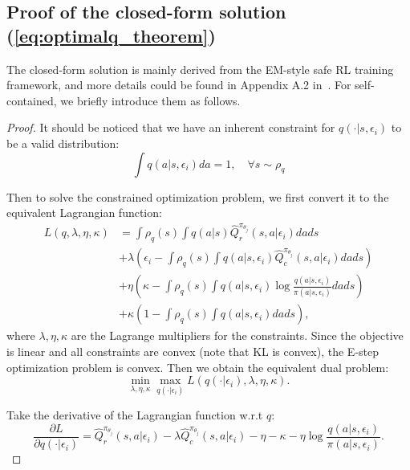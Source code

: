 \subsection{Proof of the closed-form solution (\ref{eq:optimalq_theorem})}
The closed-form solution is mainly derived from the EM-style safe RL training framework, and more details could be found in Appendix A.2 in~\cite{liu2022constrained}. For self-contained, we briefly introduce them as follows.
\label{app_subsection: Proof of the closed-form solution}
\begin{proof}
It should be noticed that we have an inherent constraint for $q(\cdot |s, \epsilon_i )$ to be a valid distribution:
\begin{equation}
    \int q(a | s, \epsilon_i) da = 1, \quad \forall s \sim \rho_q
\end{equation}

Then to solve the constrained optimization problem, we first convert it to the equivalent Lagrangian function:
\begin{align}
    L(q,\lambda, \eta, \kappa) & = \int \rho_q(s) \int q(a|s) \hat{Q}^{\pi_{\theta_j}}_r(s,a|\epsilon_i) da ds \\
    &+ \lambda \left( \epsilon_i - \int\rho_q(s)\int q(a|s, \epsilon_i) \hat{Q}^{\pi_{\theta_j}}_c(s,a|\epsilon_i) dads \right) \\ 
    & + \eta \left(\kappa - \int\rho_q(s)\int q(a|s, \epsilon_i) \log \frac{q(a|s, \epsilon_i)}{\pi(a|s, \epsilon_i)}dads \right) \\
    &+ \kappa \left(1 - \int\rho_q(s)\int q(a|s, \epsilon_i)dads \right),
    \label{eq:lagrangian}
\end{align}
where $\lambda, \eta, \kappa$ are the Lagrange multipliers for the constraints. 
Since the objective is linear and all constraints are convex (note that KL is convex), the E-step optimization problem is convex.
Then we obtain the equivalent dual problem:
\begin{equation}
    \min_{\lambda, \eta, \kappa} \max_{q(\cdot | \epsilon_i)} L(q(\cdot | \epsilon_i), \lambda, \eta, \kappa).
    \label{eq:dual_formulation}
\end{equation}

Take the derivative of the Lagrangian function w.r.t $q$:
\begin{equation}
    \frac{\partial L}{\partial q(\cdot | \epsilon_i)} = \hat{Q}^{\pi_{\theta_j}}_r(s,a| \epsilon_i) - \lambda \hat{Q}^{\pi_{\theta_j}}_c(s,a| \epsilon_i) - \eta - \kappa - \eta\log\frac{q(a|s, \epsilon_i)}{\pi(a|s, \epsilon_i)}.
    \label{eq:q_partial}
\end{equation}


\end{proof}
